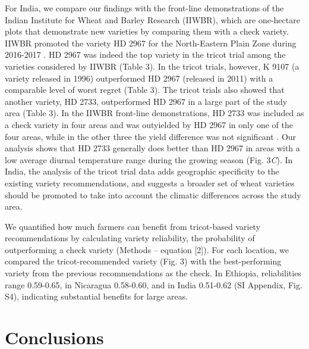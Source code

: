 \documentclass[9pt,twocolumn,twoside]{pnas-new}
\begin{document}
For India, we compare our findings with the front-line demonstrations of the Indian Institute for Wheat and Barley Research (IIWBR), which are one-hectare plots that demonstrate new varieties by comparing them with a check variety. IIWBR promoted the variety HD 2967 for the North-Eastern Plain Zone during 2016-2017 \cite{icar2017progress}. HD 2967 was indeed the top variety in the tricot trial among the varieties considered by IIWBR (Table 3). In the tricot trials, however, K 9107 (a variety released in 1996) outperformed HD 2967 (released in 2011) with a comparable level of worst regret (Table 3). The tricot trials also showed that another variety, HD 2733, outperformed HD 2967 in a large part of the study area (Table 3). In the IIWBR front-line demonstrations, HD 2733 was included as a check variety in four areas and was outyielded by HD 2967 in only one of the four areas, while in the other three the yield difference was not significant \cite{icar2017progress}. Our analysis shows that HD 2733 generally does better than HD 2967 in areas with a low average diurnal temperature range during the growing season (Fig. 3\textit{C}). In India, the analysis of the tricot trial data adds geographic specificity to the existing variety recommendations, and suggests a broader set of wheat varieties should be promoted to take into account the climatic differences across the study area.

We quantified how much farmers can benefit from tricot-based variety recommendations by calculating variety reliability, the probability of outperforming a check variety (Methods -- equation [2]). For each location, we compared the tricot-recommended variety (Fig. 3) with the best-performing variety from the previous recommendations as the check. In Ethiopia, reliabilities range 0.59-0.65, in Nicaragua 0.58-0.60, and in India 0.51-0.62 (SI Appendix, Fig. S4), indicating substantial benefits for large areas.

\section*{Conclusions} 
\end{document}
